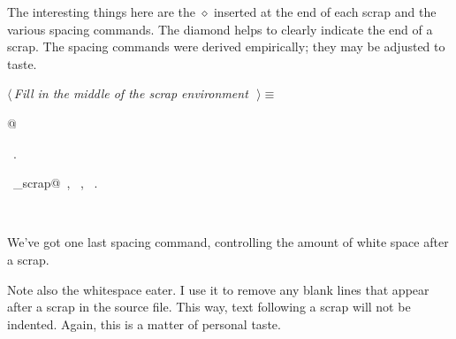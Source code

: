 \documentclass{report}
\begin{document}
The interesting things here are the $\diamond$ inserted at the end of
each scrap and the various spacing commands. The diamond helps to
clearly indicate the end of a scrap. The spacing commands were derived
empirically; they may be adjusted to taste.

\begin{flushleft} \small
\begin{minipage}{\linewidth} \label{scrap60}
$\langle\,${\it Fill in the middle of the scrap environment}\nobreak\ {\footnotesize {}}$\,\rangle\equiv$
\vspace{-1ex}
\begin{list}{}{} \item
\mbox{}@{\NWsep}
\end{list}
\vspace{-1ex}
\footnotesize\addtolength{\baselineskip}{-1ex}
\begin{list}{}{\setlength{\itemsep}{-\parsep}\setlength{\itemindent}{-\leftmargin}}
\item \NWtxtMacroRefIn\ .
\end{list}
\vspace{-2ex}
\footnotesize\addtolength{\baselineskip}{-1ex}
\begin{list}{}{\setlength{\itemsep}{-\parsep}\setlength{\itemindent}{-\leftmargin}}
\item \NWtxtIdentsUsed\nobreak\  \verb@copy_scrap@\nobreak\ , \verb@fputs@\nobreak\ , \verb@TRUE@\nobreak\ .\end{list}
\end{minipage}\\[4ex]
\end{flushleft}
\newpage
\noindent
We've got one last spacing command, controlling the amount of white
space after a scrap.

Note also the whitespace eater. I use it to remove any blank lines
that appear after a scrap in the source file. This way, text following
a scrap will not be indented. Again, this is a matter of personal taste.
\end{document}

